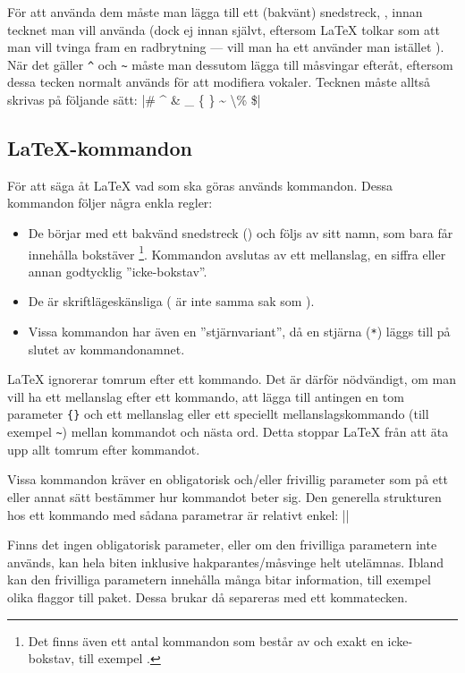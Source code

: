 \documentclass[10pt,../../a4.tex]{subfiles}
\begin{document}
För att använda dem måste man lägga till ett (bakvänt) snedstreck,
\cmd*{}, innan tecknet man vill använda (dock ej innan
\cmd*{} självt, eftersom \LaTeX{} tolkar
\cmd{\textbackslash} som att man vill tvinga fram en
radbrytning — vill man ha ett \cmd*{} använder man istället
).
När det gäller \verb|^| och \verb|~| måste man
dessutom lägga till måsvingar efteråt, eftersom dessa tecken normalt används för att
modifiera vokaler. Tecknen måste alltså skrivas på följande sätt:
\latex|\# \^{} \& \_ \{ \} \~{} \textbackslash \% \$|

\subsection{\LaTeX-kommandon}
För att säga åt \LaTeX{} vad som ska göras används kommandon. Dessa
kommandon följer några enkla regler:
\begin{itemize}
	\item De börjar med ett bakvänd snedstreck (\cmd*{}) och följs av sitt
	namn, som bara får innehålla bokstäver%
	\footnote{Det finns även ett antal kommandon som består av \cmd*{} och
	exakt en icke-bokstav, till exempel \cmd{\&}.}.
	Kommandon avslutas av ett
	mellanslag, en siffra eller annan godtycklig ”icke-bokstav”.
	
	\item De är skriftlägeskänsliga ( är inte samma sak som
	).
	
	\item Vissa kommandon har även en ”stjärnvariant”, då en stjärna
	(\texttt{*}) läggs till på slutet av kommandonamnet.
\end{itemize}

\LaTeX{} ignorerar tomrum efter ett kommando. Det är därför nödvändigt, om
man vill ha ett mellanslag efter ett kommando, att lägga till antingen en
tom parameter \texttt{\{\}} och ett mellanslag eller ett speciellt
mellanslagskommando (till exempel \texttt{\~{}}) mellan
kommandot och nästa ord. Detta stoppar \LaTeX{} från att äta upp allt
tomrum efter kommandot.

Vissa kommandon kräver en obligatorisk och/eller frivillig parameter som
på ett eller annat sätt bestämmer hur kommandot beter sig. Den generella
strukturen hos ett kommando med sådana parametrar är relativt enkel:
\latex||

Finns det ingen obligatorisk parameter, eller om den frivilliga parametern
inte används, kan hela biten inklusive hakparantes/måsvinge helt
utelämnas. Ibland kan den frivilliga parametern innehålla många bitar
information, till exempel olika flaggor till paket. Dessa brukar då
separeras med ett kommatecken.
\end{document}
